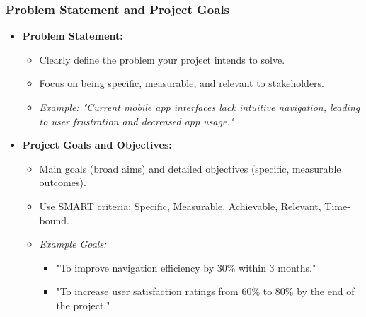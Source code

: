 \documentclass{beamer}
\begin{document}
\begin{frame}[fragile]
    \frametitle{Problem Statement and Project Goals}
    \begin{itemize}
        \item \textbf{Problem Statement:}
        \begin{itemize}
            \item Clearly define the problem your project intends to solve.
            \item Focus on being specific, measurable, and relevant to stakeholders.
            \item \textit{Example: "Current mobile app interfaces lack intuitive navigation, leading to user frustration and decreased app usage."}
        \end{itemize}
        
        \item \textbf{Project Goals and Objectives:}
        \begin{itemize}
            \item Main goals (broad aims) and detailed objectives (specific, measurable outcomes).
            \item Use SMART criteria: Specific, Measurable, Achievable, Relevant, Time-bound.
            \item \textit{Example Goals:}
            \begin{itemize}
                \item "To improve navigation efficiency by 30\% within 3 months."
                \item "To increase user satisfaction ratings from 60\% to 80\% by the end of the project."
            \end{itemize}
        \end{itemize}
    \end{itemize}
\end{frame}
\end{document}
